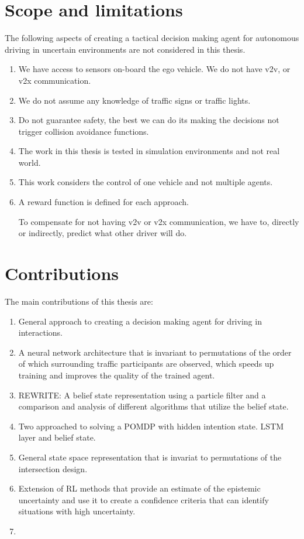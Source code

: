 \section{Scope and limitations}
\label{sec:scope}
The following aspects of creating a tactical decision making agent for autonomous driving in uncertain environments are not considered in this thesis. 

\begin{enumerate}
	\item We have access to sensors on-board the ego vehicle. We do not have v2v, or v2x communication. 
	\item We do not assume any knowledge of traffic signs or traffic lights. 
	\item Do not guarantee safety, the best we can do its making the decisions not trigger collision avoidance functions. 
	\item The work in this thesis is tested in simulation environments and not real world. 
	\item This work considers the control of one vehicle and not multiple agents. 
	\item A reward function is defined for each approach. 
	
	To compensate for not having v2v or v2x communication, we have to, directly or indirectly, predict what other driver will do. 
	
\end{enumerate}


\section{Contributions}
\label{sec:contributions}
The main contributions of this thesis are:
\begin{enumerate}
	\item General approach to creating a decision making agent for driving in interactions. 
	\item A neural network architecture that is invariant to permutations of the order of which surrounding traffic participants are observed, which speeds up training and improves the quality of the trained agent. 
	\item REWRITE: A belief state representation using a particle filter and a comparison and analysis of different algorithms that utilize the belief state. 
	\item Two approached to solving a POMDP with hidden intention state. LSTM layer and belief state. 
	\item General state space representation that is invariat to permutations of the intersection design. 
	\item Extension of RL methods that provide an estimate of the epistemic uncertainty and use it to create a confidence criteria that can identify situations with high uncertainty. 
	\item {}

\end{enumerate}


